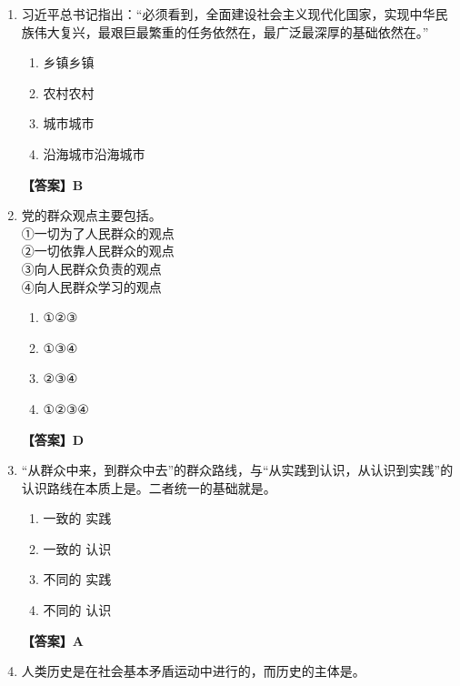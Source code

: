 \documentclass[UTF8,11pt,a4paper]{ctexart}
\begin{document}
\begin{enumerate}[label=\textbf{\arabic*.}, leftmargin=2.5em, itemsep=0.7em]
\begin{enumerate}[label=\Alph*., leftmargin=2em, itemsep=0.1em, topsep=0.15em]
\item 生产、分配、再生产和消费
\item 生产、分配、交换和再生产
\end{enumerate}
\textbf{【答案】B}
\item 习近平总书记指出：“必须看到，全面建设社会主义现代化国家，实现中华民族伟大复兴，最艰巨最繁重的任务依然在\allowbreak\underline{\hspace{4em}}，最广泛最深厚的基础依然在\allowbreak\underline{\hspace{4em}}。”
\begin{enumerate}[label=\Alph*., leftmargin=2em, itemsep=0.1em, topsep=0.15em]
\item 乡镇乡镇
\item 农村农村
\item 城市城市
\item 沿海城市沿海城市
\end{enumerate}
\textbf{【答案】B}
\item 党的群众观点主要包括\allowbreak\underline{\hspace{4em}}。\\ ①一切为了人民群众的观点\\ ②一切依靠人民群众的观点\\ ③向人民群众负责的观点\\ ④向人民群众学习的观点
\begin{enumerate}[label=\Alph*., leftmargin=2em, itemsep=0.1em, topsep=0.15em]
\item ①②③
\item ①③④
\item ②③④
\item ①②③④
\end{enumerate}
\textbf{【答案】D}
\item “从群众中来，到群众中去”的群众路线，与“从实践到认识，从认识到实践”的认识路线在本质上是\allowbreak\underline{\hspace{4em}}。二者统一的基础就是\allowbreak\underline{\hspace{4em}}。
\begin{enumerate}[label=\Alph*., leftmargin=2em, itemsep=0.1em, topsep=0.15em]
\item 一致的 实践
\item 一致的 认识
\item 不同的 实践
\item 不同的 认识
\end{enumerate}
\textbf{【答案】A}
\item 人类历史是在社会基本矛盾运动中进行的，而历史的主体是\allowbreak\underline{\hspace{4em}}。

\end{enumerate}
\end{document}
